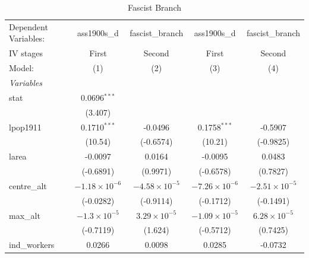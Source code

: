 
\begin{table}[htbp]
   \caption{Fascist Branch}
   \centering
   \begin{tabular}{lcccc}
      \tabularnewline \midrule \midrule
      Dependent Variables:             & ass1900s\_d            & fascist\_branch        & ass1900s\_d            & fascist\_branch\\   
      IV stages                        & First                  & Second                 & First                  & Second \\   
      Model:                           & (1)                    & (2)                    & (3)                    & (4)\\  
      \midrule
      \emph{Variables}\\
      stat                             & 0.0696$^{***}$         &                        &                        &   \\   
                                       & (3.407)                &                        &                        &   \\   
      lpop1911                         & 0.1710$^{***}$         & -0.0496                & 0.1758$^{***}$         & -0.5907\\   
                                       & (10.54)                & (-0.6574)              & (10.21)                & (-0.9825)\\   
      larea                            & -0.0097                & 0.0164                 & -0.0095                & 0.0483\\   
                                       & (-0.6891)              & (0.9971)               & (-0.6578)              & (0.7827)\\   
      centre\_alt                      & $-1.18\times 10^{-6}$  & $-4.58\times 10^{-5}$  & $-7.26\times 10^{-6}$  & $-2.51\times 10^{-5}$\\    
                                       & (-0.0282)              & (-0.9114)              & (-0.1712)              & (-0.1491)\\   
      max\_alt                         & $-1.3\times 10^{-5}$   & $3.29\times 10^{-5}$   & $-1.09\times 10^{-5}$  & $6.28\times 10^{-5}$\\    
                                       & (-0.7119)              & (1.624)                & (-0.5712)              & (0.7425)\\   
      ind\_workers                     & 0.0266                 & 0.0098                 & 0.0285                 & -0.0732\\   

\end{tabular}
\end{table}
